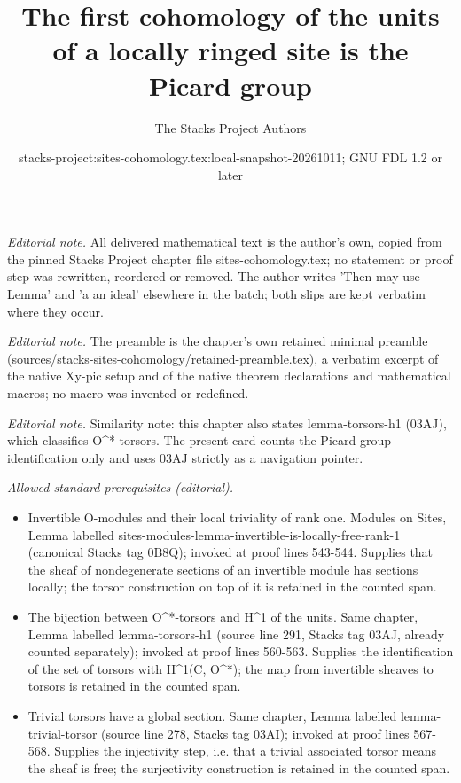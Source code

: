 \documentclass[10pt,a4paper]{amsart}
\title{The first cohomology of the units of a locally ringed site is the Picard group}
\author{The Stacks Project Authors}
\date{stacks-project:sites-cohomology.tex:local-snapshot-20261011; GNU FDL 1.2 or later}
\theoremstyle{plain}
\theoremstyle{definition}
\theoremstyle{remark}
\numberwithin{equation}{subsection}
\begin{document}
\maketitle
\noindent\textit{Editorial note.} All delivered mathematical text is the author's own, copied from the pinned Stacks Project chapter file sites-cohomology.tex; no statement or proof step was rewritten, reordered or removed. The author writes 'Then may use Lemma' and 'a an ideal' elsewhere in the batch; both slips are kept verbatim where they occur.\par\medskip
\noindent\textit{Editorial note.} The preamble is the chapter's own retained minimal preamble (sources/stacks-sites-cohomology/retained-preamble.tex), a verbatim excerpt of the native Xy-pic setup and of the native theorem declarations and mathematical macros; no macro was invented or redefined.\par\medskip
\noindent\textit{Editorial note.} Similarity note: this chapter also states lemma-torsors-h1 (03AJ), which classifies O\textasciicircum{}*-torsors. The present card counts the Picard-group identification only and uses 03AJ strictly as a navigation pointer.\par\medskip
\noindent\textit{Allowed standard prerequisites (editorial).}\begin{itemize}
\item Invertible O-modules and their local triviality of rank one. Modules on Sites, Lemma labelled sites-modules-lemma-invertible-is-locally-free-rank-1 (canonical Stacks tag 0B8Q); invoked at proof lines 543-544. Supplies that the sheaf of nondegenerate sections of an invertible module has sections locally; the torsor construction on top of it is retained in the counted span.
\item The bijection between O\textasciicircum{}*-torsors and H\textasciicircum{}1 of the units. Same chapter, Lemma labelled lemma-torsors-h1 (source line 291, Stacks tag 03AJ, already counted separately); invoked at proof lines 560-563. Supplies the identification of the set of torsors with H\textasciicircum{}1(C, O\textasciicircum{}*); the map from invertible sheaves to torsors is retained in the counted span.
\item Trivial torsors have a global section. Same chapter, Lemma labelled lemma-trivial-torsor (source line 278, Stacks tag 03AI); invoked at proof lines 567-568. Supplies the injectivity step, i.e. that a trivial associated torsor means the sheaf is free; the surjectivity construction is retained in the counted span.
\end{itemize}\medskip
\end{document}
